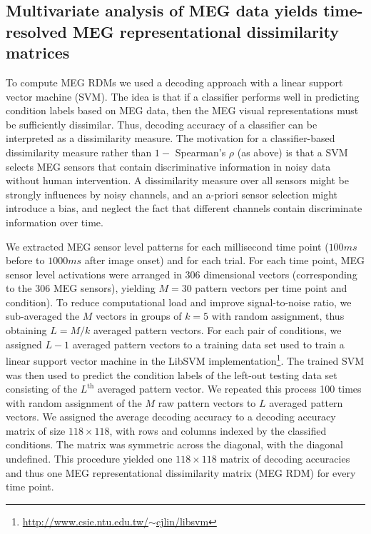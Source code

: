 \documentclass[10pt,twocolumn,letterpaper]{article}
\begin{document}
\subsection{Multivariate analysis of MEG data yields time-resolved MEG representational dissimilarity matrices}
To compute MEG RDMs we used a decoding approach with a linear support vector machine (SVM). The idea is that if a classifier performs well in predicting condition labels based on MEG data, then the MEG visual representations must be sufficiently dissimilar. Thus, decoding accuracy of a classifier can be interpreted as a dissimilarity measure. The motivation for a classifier-based dissimilarity measure rather than $1-$ Spearman's $\rho$ (as above) is that a SVM selects MEG sensors that contain discriminative information in noisy data without human intervention. A dissimilarity measure over all sensors might be strongly influences by noisy channels, and an a-priori sensor selection might introduce a bias, and neglect the fact that different channels contain discriminate information over time.

We extracted MEG sensor level patterns for each millisecond time point ($100ms$ before to $1000ms$ after image onset) and for each trial. For each time point, MEG sensor level activations were arranged in 306 dimensional vectors (corresponding to the 306 MEG sensors), yielding $M=30$ pattern vectors per time point and condition). To reduce computational load and improve signal-to-noise ratio, we sub-averaged the $M$ vectors in groups of $k = 5$ with random assignment, thus obtaining $L=M/k$ averaged pattern vectors. For each pair of conditions, we assigned $L-1$ averaged pattern vectors to a training data set used to train a linear support vector machine in the LibSVM implementation\footnote{\href{http://www.csie.ntu.edu.tw/~cjlin/libsvm}{http://www.csie.ntu.edu.tw/$\sim$cjlin/libsvm}}. The trained SVM was then used to predict the condition labels of the left-out testing data set consisting of the $L^{\text{th}}$ averaged pattern vector. We repeated this process 100 times with random assignment of the $M$ raw pattern vectors to $L$ averaged pattern vectors. We assigned the average decoding accuracy to a decoding accuracy matrix of size $118 \times 118$, with rows and columns indexed by the classified conditions. The matrix was symmetric across the diagonal, with the diagonal undefined. This procedure yielded one $118 \times 118$ matrix of decoding accuracies and thus one MEG representational dissimilarity matrix (MEG RDM) for every time point.
\end{document}
